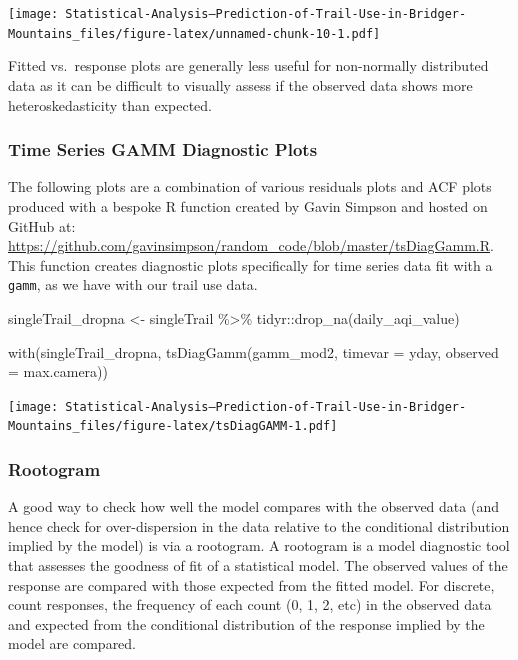 \documentclass[
]{book}
\newenvironment{Shaded}{\begin{snugshade}}{\end{snugshade}}
\newcommand{\AttributeTok}[1]{\textcolor[rgb]{0.77,0.63,0.00}{#1}}
\newcommand{\FunctionTok}[1]{\textcolor[rgb]{0.00,0.00,0.00}{#1}}
\newcommand{\NormalTok}[1]{#1}
\newcommand{\OtherTok}[1]{\textcolor[rgb]{0.56,0.35,0.01}{#1}}
\newcommand{\SpecialCharTok}[1]{\textcolor[rgb]{0.00,0.00,0.00}{#1}}
\newcommand{\StringTok}[1]{\textcolor[rgb]{0.31,0.60,0.02}{#1}}
\begin{document}
\texttt{[image: Statistical-Analysis--Prediction-of-Trail-Use-in-Bridger-Mountains\_files/figure-latex/unnamed-chunk-10-1.pdf]}

Fitted vs.~response plots are generally less useful for non-normally distributed data as it can be difficult to visually assess if the observed data shows more heteroskedasticity than expected.

\hypertarget{time-series-gamm-diagnostic-plots}{%
\subsubsection{Time Series GAMM Diagnostic Plots}\label{time-series-gamm-diagnostic-plots}}

The following plots are a combination of various residuals plots and ACF plots produced with a bespoke R function created by Gavin Simpson and hosted on GitHub at: \url{https://github.com/gavinsimpson/random_code/blob/master/tsDiagGamm.R}. This function creates diagnostic plots specifically for time series data fit with a \texttt{gamm}, as we have with our trail use data.

\begin{Shaded}
\begin{Highlighting}[]
\NormalTok{singleTrail\_dropna }\OtherTok{\textless{}{-}}\NormalTok{ singleTrail }\SpecialCharTok{\%\textgreater{}\%} 
\NormalTok{  tidyr}\SpecialCharTok{::}\FunctionTok{drop\_na}\NormalTok{(}\StringTok{\textquotesingle{}daily\_aqi\_value\textquotesingle{}}\NormalTok{)}

\FunctionTok{with}\NormalTok{(singleTrail\_dropna, }
     \FunctionTok{tsDiagGamm}\NormalTok{(gamm\_mod2, }
                \AttributeTok{timevar =}\NormalTok{ yday,}
                \AttributeTok{observed =}\NormalTok{ max.camera))}
\end{Highlighting}
\end{Shaded}

\texttt{[image: Statistical-Analysis--Prediction-of-Trail-Use-in-Bridger-Mountains\_files/figure-latex/tsDiagGAMM-1.pdf]}

\hypertarget{rootogram}{%
\subsubsection{Rootogram}\label{rootogram}}

A good way to check how well the model compares with the observed data (and hence check for over-dispersion in the data relative to the conditional distribution implied by the model) is via a rootogram. A rootogram is a model diagnostic tool that assesses the goodness of fit of a statistical model. The observed values of the response are compared with those expected from the fitted model. For discrete, count responses, the frequency of each count (0, 1, 2, etc) in the observed data and expected from the conditional distribution of the response implied by the model are compared.
\end{document}
